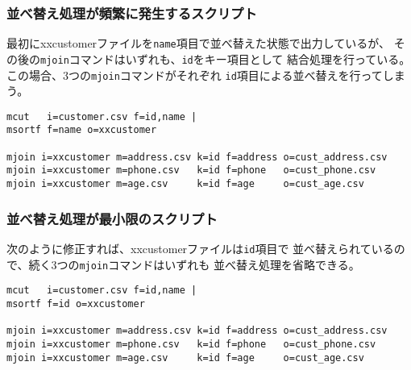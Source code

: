 \subsubsection*{並べ替え処理が頻繁に発生するスクリプト}

最初にxxcustomerファイルを\verb|name|項目で並べ替えた状態で出力しているが、
その後の\verb|mjoin|コマンドはいずれも、\verb|id|をキー項目として
結合処理を行っている。この場合、3つの\verb|mjoin|コマンドがそれぞれ
\verb|id|項目による並べ替えを行ってしまう。

\begin{Verbatim}[baselinestretch=0.7,frame=single]
mcut   i=customer.csv f=id,name |
msortf f=name o=xxcustomer

mjoin i=xxcustomer m=address.csv k=id f=address o=cust_address.csv
mjoin i=xxcustomer m=phone.csv   k=id f=phone   o=cust_phone.csv
mjoin i=xxcustomer m=age.csv     k=id f=age     o=cust_age.csv
\end{Verbatim}

\subsubsection*{並べ替え処理が最小限のスクリプト}

次のように修正すれば、xxcustomerファイルは\verb|id|項目で
並べ替えられているので、続く3つの\verb|mjoin|コマンドはいずれも
並べ替え処理を省略できる。

\begin{Verbatim}[baselinestretch=0.7,frame=single]
mcut   i=customer.csv f=id,name |
msortf f=id o=xxcustomer

mjoin i=xxcustomer m=address.csv k=id f=address o=cust_address.csv
mjoin i=xxcustomer m=phone.csv   k=id f=phone   o=cust_phone.csv
mjoin i=xxcustomer m=age.csv     k=id f=age     o=cust_age.csv
\end{Verbatim}

%


